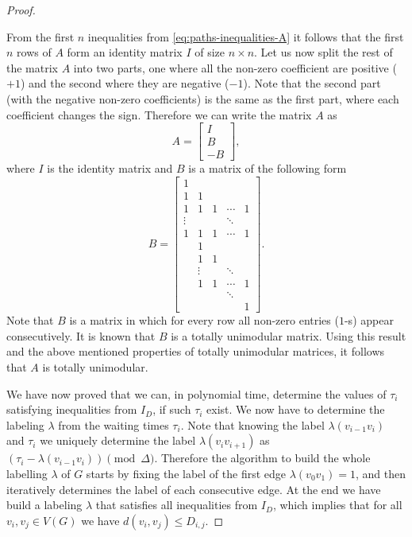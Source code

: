 \documentclass[a4paper,UKenglish,cleveref, autoref, thm-restate]{lipics-v2021}
\begin{document}
\begin{proof}
\begin{claimproof}
    From the first $n$ inequalities from \cref{eq:paths-inequalities-A} it follows that the first $n$ rows of $A$ form an identity matrix $I$ of size $n \times n$.
    Let us now split the rest of the matrix $A$ into two parts, one where all the non-zero coefficient are positive ($+1$) and the second where they are negative ($-1$).
    Note that the second part (with the negative non-zero coefficients) is the same as the first part, where each coefficient changes the sign.
    Therefore we can write the matrix $A$ as
    \begin{equation*}
    A =
        \begin{bmatrix}
        I \\
        B \\
        -B
        \end{bmatrix},
    \end{equation*}
    where $I$ is the identity matrix and $B$ is a matrix of the following form
    \begin{equation*}
    B =
        \begin{bmatrix}
        1 & & & & \\
        1 & 1 & & \\
        1 & 1 & 1 & \cdots & 1 \\
        \vdots & & & \ddots & \\
        1 & 1 & 1 & \cdots & 1\\
        & 1 & & & \\
        & 1 & 1 & & \\
        & \vdots & & \ddots & \\
        & 1 & 1 & \cdots & 1\\
        & & & \ddots & \\
        & & & & 1
        \end{bmatrix}.
    \end{equation*}
    Note that $B$ is a matrix in which for every row all non-zero entries ($1$-s) appear consecutively.
    It is known\cite{Hoffman1956Integral,Fulkerson1965Incidence} that $B$ is a totally unimodular matrix.
    Using this result and the above mentioned properties of totally unimodular matrices, it follows that $A$ is totally unimodular.
\end{claimproof}
We have now proved that we can, in polynomial time, determine the values of $\tau_i$ satisfying inequalities from $I_D$, if such $\tau_i$ exist.
We now have to determine the labeling $\lambda$ from the waiting times $\tau_i$.
Note that knowing the label $\lambda(v_{i-1}v_i)$ and $\tau_i$ we uniquely determine the label $\lambda(v_iv_{i+1})$ as $(\tau_i - \lambda(v_{i-1}v_i))\pmod{\Delta}$.
Therefore the algorithm to build the whole labelling $\lambda$ of $G$
starts by fixing the label of the first edge $\lambda(v_0v_1) = 1$, and then iteratively determines the label of each consecutive edge.
At the end we have build a labeling $\lambda$ that satisfies all inequalities from $I_D$, which implies that for all $v_i,v_j \in V(G)$ we have $d(v_i,v_j) \leq D_{i,j}$.
\end{proof}
\end{document}

